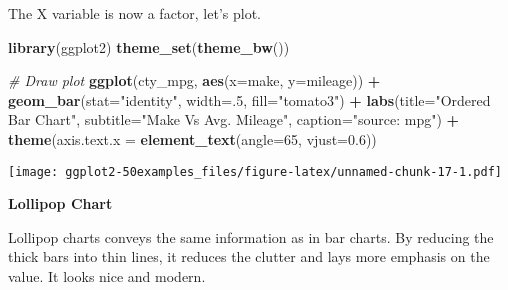 \documentclass[a4paper]{article}
\newenvironment{Shaded}{\begin{snugshade}}{\end{snugshade}}
\newcommand{\KeywordTok}[1]{\textcolor[rgb]{0.13,0.29,0.53}{\textbf{#1}}}
\newcommand{\DataTypeTok}[1]{\textcolor[rgb]{0.13,0.29,0.53}{#1}}
\newcommand{\DecValTok}[1]{\textcolor[rgb]{0.00,0.00,0.81}{#1}}
\newcommand{\FloatTok}[1]{\textcolor[rgb]{0.00,0.00,0.81}{#1}}
\newcommand{\StringTok}[1]{\textcolor[rgb]{0.31,0.60,0.02}{#1}}
\newcommand{\CommentTok}[1]{\textcolor[rgb]{0.56,0.35,0.01}{\textit{#1}}}
\newcommand{\OperatorTok}[1]{\textcolor[rgb]{0.81,0.36,0.00}{\textbf{#1}}}
\newcommand{\NormalTok}[1]{#1}
\begin{document}
The X variable is now a factor, let's plot.

\begin{Shaded}
\begin{Highlighting}[]
\KeywordTok{library}\NormalTok{(ggplot2)}
\KeywordTok{theme_set}\NormalTok{(}\KeywordTok{theme_bw}\NormalTok{())}

\CommentTok{# Draw plot}
\KeywordTok{ggplot}\NormalTok{(cty_mpg, }\KeywordTok{aes}\NormalTok{(}\DataTypeTok{x=}\NormalTok{make, }\DataTypeTok{y=}\NormalTok{mileage)) }\OperatorTok{+}\StringTok{ }
\StringTok{  }\KeywordTok{geom_bar}\NormalTok{(}\DataTypeTok{stat=}\StringTok{"identity"}\NormalTok{, }\DataTypeTok{width=}\NormalTok{.}\DecValTok{5}\NormalTok{, }\DataTypeTok{fill=}\StringTok{"tomato3"}\NormalTok{) }\OperatorTok{+}\StringTok{ }
\StringTok{  }\KeywordTok{labs}\NormalTok{(}\DataTypeTok{title=}\StringTok{"Ordered Bar Chart"}\NormalTok{, }
       \DataTypeTok{subtitle=}\StringTok{"Make Vs Avg. Mileage"}\NormalTok{, }
       \DataTypeTok{caption=}\StringTok{"source: mpg"}\NormalTok{) }\OperatorTok{+}\StringTok{ }
\StringTok{  }\KeywordTok{theme}\NormalTok{(}\DataTypeTok{axis.text.x =} \KeywordTok{element_text}\NormalTok{(}\DataTypeTok{angle=}\DecValTok{65}\NormalTok{, }\DataTypeTok{vjust=}\FloatTok{0.6}\NormalTok{))}
\end{Highlighting}
\end{Shaded}

\texttt{[image: ggplot2-50examples\_files/figure-latex/unnamed-chunk-17-1.pdf]}

\newpage

\textbf{Lollipop Chart}

Lollipop charts conveys the same information as in bar charts. By
reducing the thick bars into thin lines, it reduces the clutter and lays
more emphasis on the value. It looks nice and modern.
\end{document}
